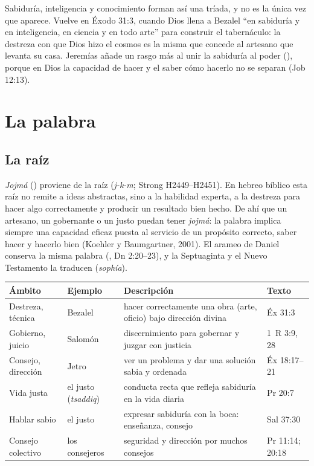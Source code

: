 Sabiduría, inteligencia y conocimiento forman así una tríada, y no es la única vez que aparece. Vuelve en Éxodo 31:3, cuando Dios llena a Bezalel ``en sabiduría y en inteligencia, en ciencia y en todo arte'' para construir el tabernáculo: la destreza con que Dios hizo el cosmos es la misma que concede al artesano que levanta su casa. Jeremías añade un rasgo más al unir la sabiduría al poder (), porque en Dios la capacidad de hacer y el saber cómo hacerlo no se separan (Job 12:13).

\section{La palabra}

\subsection{La raíz }

\emph{Jojmá} () proviene de la raíz  (\emph{j-k-m}; Strong H2449--H2451). En hebreo bíblico esta raíz no remite a ideas abstractas, sino a la habilidad experta, a la destreza para hacer algo correctamente y producir un resultado bien hecho. De ahí que un artesano, un gobernante o un justo puedan tener \emph{jojmá}: la palabra implica siempre una capacidad eficaz puesta al servicio de un propósito correcto, saber hacer y hacerlo bien (Koehler y Baumgartner, 2001). El arameo de Daniel conserva la misma palabra (, Dn 2:20--23), y la Septuaginta y el Nuevo Testamento la traducen  (\emph{sophía}).

\begin{center}\small\renewcommand{\arraystretch}{1.25}
\begin{tabular}{@{}L{2.4cm}L{2.3cm}L{5.6cm}L{4.1cm}@{}}
\toprule
\textbf{Ámbito} & \textbf{Ejemplo} & \textbf{Descripción} & \textbf{Texto} \\ \midrule
Destreza, técnica & Bezalel & hacer correctamente una obra (arte, oficio) bajo dirección divina & Éx 31:3 \\
Gobierno, juicio & Salomón & discernimiento para gobernar y juzgar con justicia & 1~R 3:9, 28 \\
Consejo, dirección & Jetro & ver un problema y dar una solución sabia y ordenada & Éx 18:17--21 \\
Vida justa & el justo (\emph{tsaddiq}) & conducta recta que refleja sabiduría en la vida diaria & Pr 20:7 \\
Hablar sabio & el justo & expresar sabiduría con la boca: enseñanza, consejo & Sal 37:30 \\
Consejo colectivo & los consejeros & seguridad y dirección por muchos consejos & Pr 11:14; 20:18 \\
\bottomrule
\end{tabular}\end{center}

